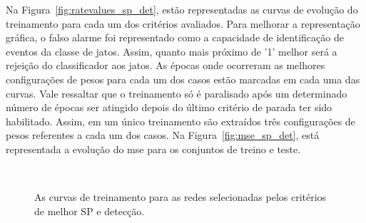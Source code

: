 Na Figura~\ref{fig:ratevalues_sp_det}, estão representadas as curvas de evolução do treinamento para cada um dos critérios avaliados.
Para melhorar a representação gráfica, o falso alarme foi representado como a capacidade de identificação de eventos da classe de jatos. 
Assim, quanto mais próximo de '1' melhor será a rejeição do classificador aos jatos.
As épocas onde ocorreram as melhores configurações de pesos para cada um dos casos estão marcadas em cada uma das curvas.
Vale ressaltar que o treinamento só é paralisado após um determinado número de épocas ser atingido depois do último critério de parada ter sido
habilitado. Assim, em um único treinamento são extraídos três configurações de pesos referentes a cada um dos casos.
Na Figura~\ref{fig:mse_sp_det}, está representada a evolução do \acrshort{mse} para os conjuntos de treino e teste.

\begin{figure}[ht!]
    \begin{center}
        \hspace{0.02\textwidth}
        \\ 
    \end{center}
    \caption[As curvas de treinamento para as redes selecionadas pelos critérios de melhor SP e detecção.]{
    As curvas de treinamento para as redes selecionadas pelos critérios de melhor SP e detecção.}
\end{figure}

